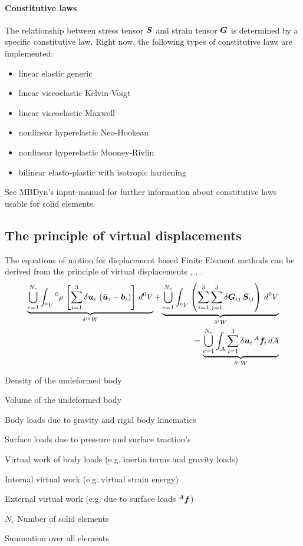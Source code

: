 \paragraph{Constitutive laws}
The relationship between stress tensor $\bm{S}$ and strain tensor $\bm{G}$ is determined by a specific constitutive law.
Right now, the following types of constitutive laws are implemented:
\begin{itemize}
\item linear elastic generic
\item linear viscoelastic Kelvin-Voigt \cite{KUEBLER2005}
\item linear viscoelastic Maxwell \cite{bleyer2018numericaltours}
\item nonlinear hyperelastic Neo-Hookean \cite{KUEBLER2005}
\item nonlinear hyperelastic Mooney-Rivlin \cite{BATHE2016}
\item bilinear elasto-plastic with isotropic hardening \cite{BATHE2016}
\end{itemize}
See MBDyn's input-manual for further information about constitutive laws usable for solid elements.

\subsection{The principle of virtual displacements}
The equations of motion for displacement based Finite Element methods can be derived from the principle of virtual displacements \cite{WALLRAPP1998}, \cite{BATHE2016}, \cite{KUEBLER2005}.
\begin{eqnarray}
\underbrace{\bigcup_{e=1}^{N_e}\int_{^0V} {^0}\rho \, \left[\sum_{i=1}^3 \delta\bm{u}_i\,\left(\ddot{\bm{u}}_i - \bm{b}_i\right) \right]\, d^0V}_{\delta ^mW} + \underbrace{\bigcup_{e=1}^{N_e}\int_{^0V} \left(\sum_{i=1}^3\sum_{j=1}^3 \delta\bm{G}_{ij}\,\bm{S}_{ij} \right) \, d^0V}_{\delta^iW} \nonumber \\
= \underbrace{\bigcup_{e=1}^{N_e}\int_{A} \sum_{i=1}^3 \delta\bm{u}_i\,^A\bm{f}_i \,dA}_{\delta^eW}
\end{eqnarray}

\begin{description}
\item[${^0}\rho$] Density of the undeformed body
\item[${^0}V$] Volume of the undeformed body
\item[$\T{b}$] Body loads due to gravity and rigid body kinematics
\item[${^A}\T{f}$] Surface loads due to pressure and surface traction's
\item[${^m}W$] Virtual work of body loads (e.g. inertia terms and gravity loads)
\item[${^i}W$] Internal virtual work (e.g. virtual strain energy)
\item[${^e}W$] External virtual work (e.g. due to surface loads ${^A}\T{f}$)
\item{$N_e$} Number of solid elements
\item[$\bigcup$] Summation over all elements
\end{description}

